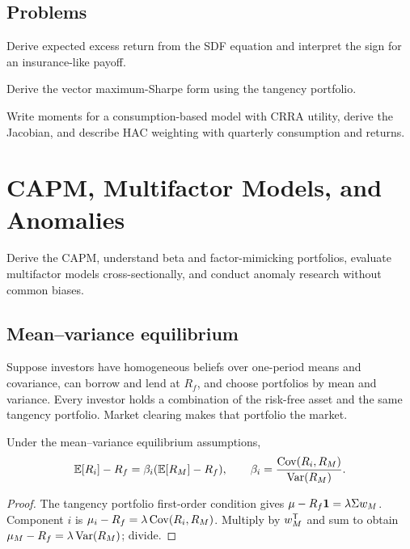 \section{Problems}

\begin{exercise}
Derive expected excess return from the SDF equation and interpret the sign for an
insurance-like payoff.
\end{exercise}
\begin{exercise}
Derive the vector maximum-Sharpe form using the tangency portfolio.
\end{exercise}
\begin{exercise}
Write moments for a consumption-based model with CRRA utility, derive the Jacobian,
and describe HAC weighting with quarterly consumption and returns.
\end{exercise}


\chapter{CAPM, Multifactor Models, and Anomalies}

\begin{objectives}
Derive the CAPM, understand beta and factor-mimicking portfolios, evaluate
multifactor models cross-sectionally, and conduct anomaly research without common
biases.
\end{objectives}

\section{Mean--variance equilibrium}

Suppose investors have homogeneous beliefs over one-period means and covariance,
can borrow and lend at $R_f$, and choose portfolios by mean and variance. Every
investor holds a combination of the risk-free asset and the same tangency portfolio.
Market clearing makes that portfolio the market.

\begin{theorem}[CAPM]
Under the mean--variance equilibrium assumptions,
\[
\operatorname{\mathbb E}[R_i]-R_f=\beta_i(\operatorname{\mathbb E}[R_M]-R_f),\qquad
\beta_i=\frac{\operatorname{Cov}(R_i,R_M)}{\operatorname{Var}(R_M)}.
\]
\end{theorem}
\begin{proof}
The tangency portfolio first-order condition gives
$\mu-R_f\bm 1=\lambda\Sigma w_M$. Component $i$ is
$\mu_i-R_f=\lambda\operatorname{Cov}(R_i,R_M)$. Multiply by $w_M^\mathsf T$ and sum to obtain
$\mu_M-R_f=\lambda\operatorname{Var}(R_M)$; divide.
\end{proof}

